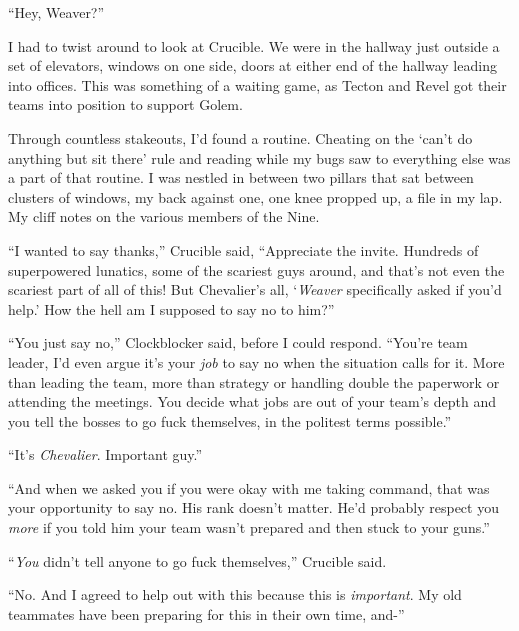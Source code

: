 





``Hey, Weaver?''



I had to twist around to look at Crucible.  We were in the hallway just outside a set of elevators, windows on one side, doors at either end of the hallway leading into offices.  This was something of a waiting game, as Tecton and Revel got their teams into position to support Golem.



Through countless stakeouts, I'd found a routine.  Cheating on the `can't do anything but sit there' rule and reading while my bugs saw to everything else was a part of that routine.  I was nestled in between two pillars that sat between clusters of windows, my back against one, one knee propped up, a file in my lap.  My cliff notes on the various members of the Nine.



``I wanted to say thanks,'' Crucible said, ``Appreciate the invite.  Hundreds of superpowered lunatics, some of the scariest guys around, and that's not even the scariest part of all of this!  But Chevalier's all, `\emph{Weaver} specifically asked if you'd help.'  How the hell am I supposed to say no to him?''



``You just say no,'' Clockblocker said, before I could respond.  ``You're team leader, I'd even argue it's your \emph{job }to say no when the situation calls for it.  More than leading the team, more than strategy or handling double the paperwork or attending the meetings.  You decide what jobs are out of your team's depth and you tell the bosses to go fuck themselves, in the politest terms possible.''



``It's \emph{Chevalier}.  Important guy.''



``And when we asked you if you were okay with me taking command, that was your opportunity to say no.  His rank doesn't matter.  He'd probably respect you \emph{more} if you told him your team wasn't prepared and then stuck to your guns.''



``\emph{You} didn't tell anyone to go fuck themselves,'' Crucible said.



``No.  And I agreed to help out with this because this is \emph{important}.  My old teammates have been preparing for this in their own time, and-''



